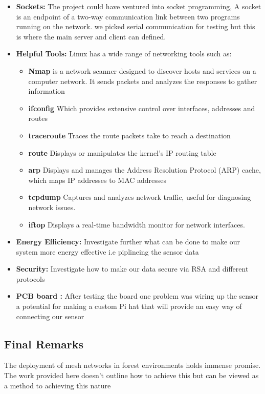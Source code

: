 \begin{itemize}
    \item \textbf{Sockets:} The project could have ventured into socket programming, A socket is an endpoint of a two-way communication link between two programs running on the network. we picked serial communication for testing but this is where the main server and client can defined.
    \item \textbf{Helpful Tools:}  Linux has a wide range of networking tools such as:
    \begin{itemize}
        \item\textbf{Nmap} is a network scanner designed to discover hosts and services on a computer network. It sends packets and analyzes the responses to gather information 
        \item \textbf{ifconfig} Which provides extensive control over interfaces, addresses and routes
        \item \textbf{traceroute} Traces the route packets take to reach a destination
        \item \textbf{route} Displays or manipulates the kernel's IP routing table
        \item \textbf{arp} Displays and manages the Address Resolution Protocol (ARP) cache, which maps IP addresses to MAC addresses
        \item \textbf{tcpdump} Captures and analyzes network traffic, useful for diagnosing network issues.
        \item \textbf{iftop} Displays a real-time bandwidth monitor for network interfaces.
    \end{itemize} 
    \item \textbf{Energy Efficiency:} Investigate further what can be done to make  our system more energy effective i.e piplineing the sensor data
    \item \textbf{Security:} Investigate how to make our data secure via RSA and different protocols
    \item \textbf{PCB board :} After testing the board one problem was wiring up the sensor a potential for making a custom  Pi hat that will provide an easy way of connecting  our sensor 
 
   
\end{itemize}
\newpage
\subsection{Final Remarks}
The deployment of mesh networks in forest environments holds immense promise. The work provided here doesn't outline how to achieve this but can be viewed as a method to achieving  this nature